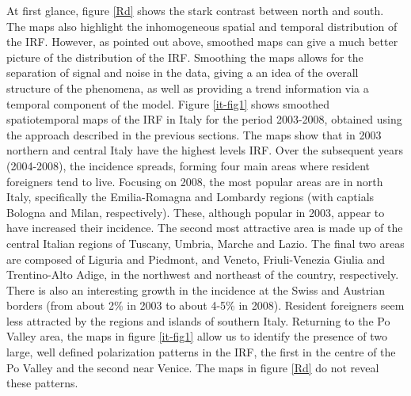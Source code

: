 At first glance, figure \ref{Rd} shows the stark contrast between north and south. The maps also highlight the inhomogeneous spatial and temporal distribution of the IRF. However, as pointed out above, smoothed maps can give a much better picture of the distribution of the IRF. Smoothing the maps allows for the separation of signal and noise in the data, giving a an idea of the overall structure of the phenomena, as well as providing a trend information via a temporal component of the model. Figure \ref{it-fig1} shows smoothed spatiotemporal maps of the IRF in Italy for the period 2003-2008, obtained using the approach described in the previous sections. The maps show that in 2003 northern and central Italy have the highest levels IRF. Over the subsequent years (2004-2008), the incidence spreads, forming four main areas where resident foreigners tend to live. Focusing on 2008, the most popular areas are in north Italy, specifically the Emilia-Romagna and Lombardy regions (with captials Bologna and Milan, respectively). These, although popular in 2003, appear to have increased their incidence. The second most attractive area is made up of the central Italian regions of Tuscany, Umbria, Marche and Lazio. The final two areas are composed of Liguria and Piedmont, and Veneto, Friuli-Venezia Giulia and Trentino-Alto Adige, in the northwest and northeast of the country, respectively. There is also an interesting growth in the incidence at the Swiss and Austrian borders (from about 2\% in 2003 to about 4-5\% in 2008). Resident foreigners seem less attracted by the regions and islands of southern Italy. Returning to the Po Valley area, the maps in figure \ref{it-fig1} allow us to identify the presence of two large, well defined polarization patterns in the IRF, the first in the centre of the Po Valley and the second near Venice. The maps in figure \ref{Rd} do not reveal these patterns.

